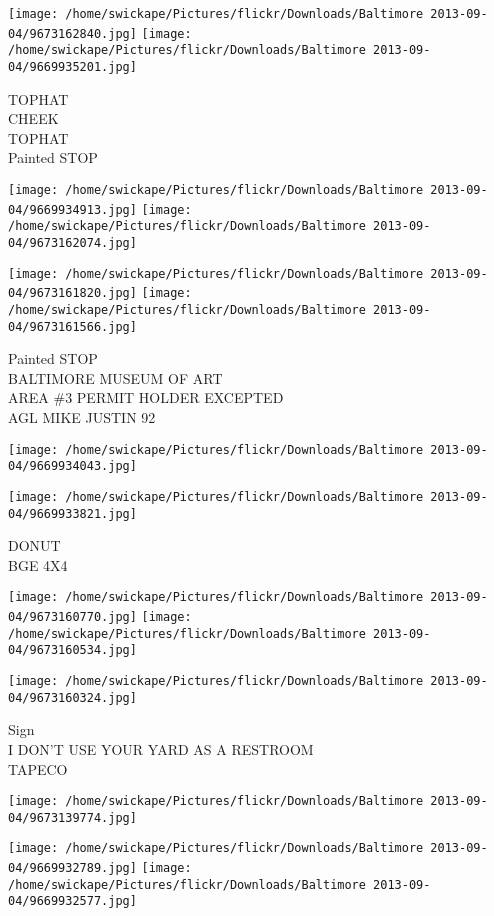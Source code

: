 \documentclass[10pt,letterpaper]{article}
\begin{document}
\texttt{[image: /home/swickape/Pictures/flickr/Downloads/Baltimore 2013-09-04/9673162840.jpg]}
\texttt{[image: /home/swickape/Pictures/flickr/Downloads/Baltimore 2013-09-04/9669935201.jpg]}

TOPHAT\\
CHEEK\\
TOPHAT\\
Painted STOP
\pagebreak

\texttt{[image: /home/swickape/Pictures/flickr/Downloads/Baltimore 2013-09-04/9669934913.jpg]}
\texttt{[image: /home/swickape/Pictures/flickr/Downloads/Baltimore 2013-09-04/9673162074.jpg]}

\texttt{[image: /home/swickape/Pictures/flickr/Downloads/Baltimore 2013-09-04/9673161820.jpg]}
\texttt{[image: /home/swickape/Pictures/flickr/Downloads/Baltimore 2013-09-04/9673161566.jpg]}

Painted STOP\\
BALTIMORE MUSEUM OF ART\\
AREA \#3 PERMIT HOLDER EXCEPTED\\
AGL MIKE JUSTIN 92
\pagebreak

\texttt{[image: /home/swickape/Pictures/flickr/Downloads/Baltimore 2013-09-04/9669934043.jpg]}

\vspace{0.25in}
\texttt{[image: /home/swickape/Pictures/flickr/Downloads/Baltimore 2013-09-04/9669933821.jpg]}

DONUT\\
BGE 4X4
\pagebreak

\texttt{[image: /home/swickape/Pictures/flickr/Downloads/Baltimore 2013-09-04/9673160770.jpg]}
\texttt{[image: /home/swickape/Pictures/flickr/Downloads/Baltimore 2013-09-04/9673160534.jpg]}

\vspace{0.25in}
\texttt{[image: /home/swickape/Pictures/flickr/Downloads/Baltimore 2013-09-04/9673160324.jpg]}

Sign\\
I DON'T USE YOUR YARD AS A RESTROOM\\
TAPECO
\pagebreak

\texttt{[image: /home/swickape/Pictures/flickr/Downloads/Baltimore 2013-09-04/9673139774.jpg]}

\vspace{0.25in}
\texttt{[image: /home/swickape/Pictures/flickr/Downloads/Baltimore 2013-09-04/9669932789.jpg]}
\texttt{[image: /home/swickape/Pictures/flickr/Downloads/Baltimore 2013-09-04/9669932577.jpg]}
\end{document}
